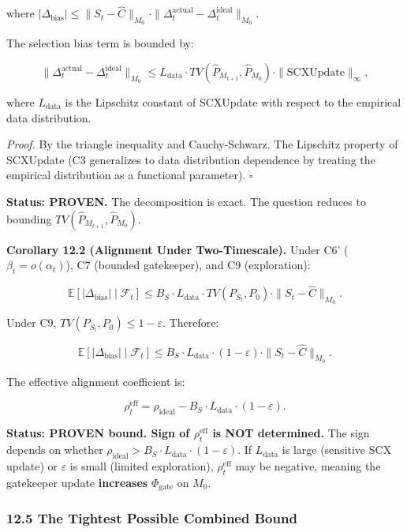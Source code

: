 \documentclass[
  12pt,
]{ctexart}
\begin{document}
where
\(|\Delta_{\text{bias}}| \leq \|S_t - \hat{C}\|_{M_0} \cdot \|\Delta_t^{\text{actual}} - \Delta_t^{\text{ideal}}\|_{M_0}\).

The selection bias term is bounded by:

\[\|\Delta_t^{\text{actual}} - \Delta_t^{\text{ideal}}\|_{M_0} \leq L_{\text{data}} \cdot TV(\hat{P}_{M_{t+1}}, \hat{P}_{M_0}) \cdot \|\text{SCXUpdate}\|_\infty,\]

where \(L_{\text{data}}\) is the Lipschitz constant of SCXUpdate with
respect to the empirical data distribution.

\emph{Proof.} By the triangle inequality and Cauchy-Schwarz. The
Lipschitz property of SCXUpdate (C3 generalizes to data distribution
dependence by treating the empirical distribution as a functional
parameter). \(\square\)

\textbf{Status: PROVEN.} The decomposition is exact. The question
reduces to bounding \(TV(\hat{P}_{M_{t+1}}, \hat{P}_{M_0})\).

\textbf{Corollary 12.2 (Alignment Under Two-Timescale).} Under C6'
(\(\beta_t = o(\alpha_t)\)), C7 (bounded gatekeeper), and C9
(exploration):

\[\mathbb{E}[|\Delta_{\text{bias}}| \mid \mathcal{F}_t] \leq B_S \cdot L_{\text{data}} \cdot TV(P_{S_t}, P_0) \cdot \|S_t - \hat{C}\|_{M_0}.\]

Under C9, \(TV(P_{S_t}, P_0) \leq 1 - \varepsilon\). Therefore:

\[\mathbb{E}[|\Delta_{\text{bias}}| \mid \mathcal{F}_t] \leq B_S \cdot L_{\text{data}} \cdot (1 - \varepsilon) \cdot \|S_t - \hat{C}\|_{M_0}.\]

The effective alignment coefficient is:

\[\rho_t^{\text{eff}} = \rho_{\text{ideal}} - B_S \cdot L_{\text{data}} \cdot (1 - \varepsilon).\]

\textbf{Status: PROVEN bound. Sign of \(\rho_t^{\text{eff}}\) is NOT
determined.} The sign depends on whether
\(\rho_{\text{ideal}} > B_S \cdot L_{\text{data}} \cdot (1 - \varepsilon)\).
If \(L_{\text{data}}\) is large (sensitive SCX update) or
\(\varepsilon\) is small (limited exploration), \(\rho_t^{\text{eff}}\)
may be negative, meaning the gatekeeper update \textbf{increases}
\(\Phi_{\text{gate}}\) on \(M_0\).

\subsubsection{12.5 The Tightest Possible Combined
Bound}\label{the-tightest-possible-combined-bound}
\end{document}
